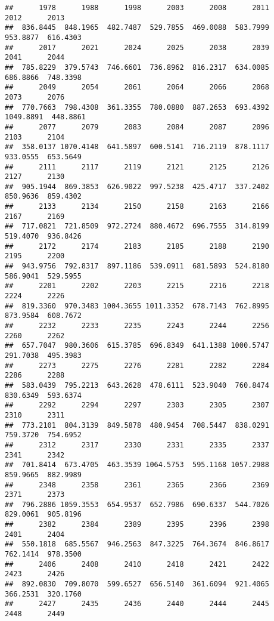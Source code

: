 \documentclass[
]{article}
\begin{document}
\begin{verbatim}
##      1978      1988      1998      2003      2008      2011      2012      2013 
##  836.8445  848.1965  482.7487  529.7855  469.0088  583.7999  953.8877  616.4303 
##      2017      2021      2024      2025      2038      2039      2041      2044 
##  785.8229  379.5743  746.6601  736.8962  816.2317  634.0085  686.8866  748.3398 
##      2049      2054      2061      2064      2066      2068      2073      2076 
##  770.7663  798.4308  361.3355  780.0880  887.2653  693.4392 1049.8891  448.8861 
##      2077      2079      2083      2084      2087      2096      2103      2104 
##  358.0137 1070.4148  641.5897  600.5141  716.2119  878.1117  933.0555  653.5649 
##      2111      2117      2119      2121      2125      2126      2127      2130 
##  905.1944  869.3853  626.9022  997.5238  425.4717  337.2402  850.9636  859.4302 
##      2133      2134      2150      2158      2163      2166      2167      2169 
##  717.0821  721.8509  972.2724  880.4672  696.7555  314.8199  519.4070  936.8426 
##      2172      2174      2183      2185      2188      2190      2195      2200 
##  943.9756  792.8317  897.1186  539.0911  681.5893  524.8180  586.9041  529.5955 
##      2201      2202      2203      2215      2216      2218      2224      2226 
##  819.3360  970.3483 1004.3655 1011.3352  678.7143  762.8995  873.9584  608.7672 
##      2232      2233      2235      2243      2244      2256      2260      2262 
##  657.7047  980.3606  615.3785  696.8349  641.1388 1000.5747  291.7038  495.3983 
##      2273      2275      2276      2281      2282      2284      2286      2288 
##  583.0439  795.2213  643.2628  478.6111  523.9040  760.8474  830.6349  593.6374 
##      2292      2294      2297      2303      2305      2307      2310      2311 
##  773.2101  804.3139  849.5878  480.9454  708.5447  838.0291  759.3720  754.6952 
##      2312      2317      2330      2331      2335      2337      2341      2342 
##  701.8414  673.4705  463.3539 1064.5753  595.1168 1057.2988  859.9665  882.9989 
##      2348      2358      2361      2365      2366      2369      2371      2373 
##  796.2886 1059.3553  654.9537  652.7986  690.6337  544.7026  829.0061  905.8196 
##      2382      2384      2389      2395      2396      2398      2401      2404 
##  550.1818  685.5567  946.2563  847.3225  764.3674  846.8617  762.1414  978.3500 
##      2406      2408      2410      2418      2421      2422      2423      2426 
##  892.0830  709.8070  599.6527  656.5140  361.6094  921.4065  366.2531  320.1760 
##      2427      2435      2436      2440      2444      2445      2448      2449 

\end{verbatim}
\end{document}
